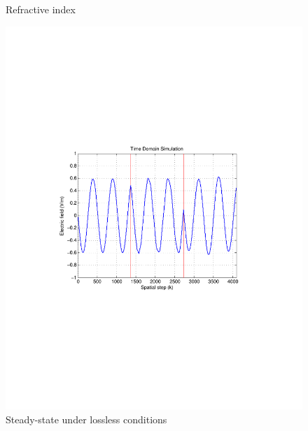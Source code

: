 \begin{figure}[H]
\caption{Refractive index}
\label{1DDNG-Refractive-Index}
\end{figure}
\begin{figure}[H]
\centering
\includegraphics[scale=0.78, trim=3.5cm 8.7cm 4.5cm 8.75cm, clip]{FigCh03_1DDNGSteadyStateLossless.pdf}
\caption{Steady-state under lossless conditions}
\label{1DDNG-SteadyState-Lossless}
\end{figure}
